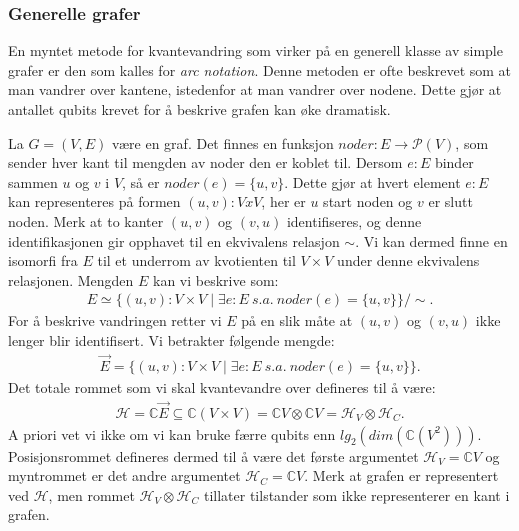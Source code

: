 
    \subsubsection{Generelle grafer}

        En myntet metode for kvantevandring som virker på en generell klasse av simple grafer er den som kalles for \emph{arc notation}. Denne metoden er ofte beskrevet som at man vandrer over kantene, istedenfor at man vandrer over nodene. Dette gjør at antallet qubits krevet for å beskrive grafen kan øke dramatisk.

        La $G=(V,E)$ være en graf. Det finnes en funksjon $noder:E\rightarrow\mathcal{P}(V)$, som sender hver kant til mengden av noder den er koblet til. Dersom $e:E$ binder sammen $u$ og $v$ i $V$, så er $noder(e)=\{u,v\}$. Dette gjør at hvert element $e:E$ kan representeres på formen $(u,v):VxV$, her er $u$ start noden og $v$ er slutt noden. Merk at to kanter $(u,v)$ og $(v,u)$ identifiseres, og denne identifikasjonen gir opphavet til en ekvivalens relasjon $\sim$. Vi kan dermed finne en isomorfi fra $E$ til et underrom av kvotienten til $V\times V$ under denne ekvivalens relasjonen. Mengden $E$ kan vi beskrive som:
        \begin{align*}
            E \simeq \{(u,v):V\times V\mid \exists e:E\ s.a.\ noder(e)=\{u,v\}\}/\sim.
        \end{align*}
        For å beskrive vandringen retter vi $E$ på en slik måte at $(u,v)$ og $(v,u)$ ikke lenger blir identifisert. Vi betrakter følgende mengde:
        \begin{align*}
            \vec{E} = \{(u,v):V\times V\mid \exists e:E\ s.a.\ noder(e)=\{u,v\}\}.
        \end{align*}
        Det totale rommet som vi skal kvantevandre over defineres til å være:
        \begin{align*}
            \mathcal{H} = \mathbb{C}\vec{E} \subseteq \mathbb{C}(V\times V)=\mathbb{C}V\otimes\mathbb{C}V=\mathcal{H}_V\otimes\mathcal{H}_C.
        \end{align*}
        A priori vet vi ikke om vi kan bruke færre qubits enn $lg_2(dim(\mathbb{C}(V^2)))$. Posisjonsrommet defineres dermed til å være det første argumentet $\mathcal{H}_V=\mathbb{C}V$ og myntrommet er det andre argumentet $\mathcal{H}_C=\mathbb{C}V$. Merk at grafen er representert ved $\mathcal{H}$, men rommet $\mathcal{H}_V\otimes\mathcal{H}_C$ tillater tilstander som ikke representerer en kant i grafen.

